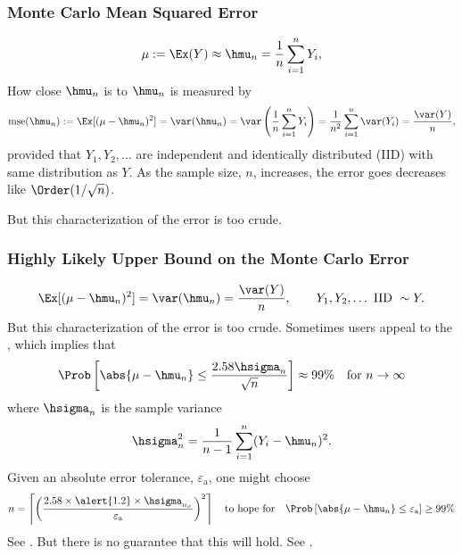 \documentclass[10pt,compress,xcolor={usenames,dvipsnames}]{beamer} %
\DeclareMathOperator{\MSE}{mse}
\newcommand{\abstol}{\varepsilon_{\text{a}}}
\begin{document}
\begin{frame}
\frametitle{Monte Carlo Mean Squared Error}
\[
\mu := \Ex(Y) \approx \hmu_n = \frac{1}{n} \sum_{i=1}^n Y_i,
\]
How close $\hmu_n$ is to $\hmu_n$ is measured by 
\[
\MSE(\hmu_n) := \Ex[(\mu-\hmu_n)^2]  = \var(\hmu_n) = \var\left(\frac{1}{n} \sum_{i=1}^n Y_i \right) =  \frac{1}{n^2} \sum_{i=1}^n \var(Y_i)= \frac{\var(Y)}{n},
\]
provided that $Y_1, Y_2, \ldots $ are independent and identically distributed (IID) with same distribution as $Y$.  As the sample size, $n$, increases, the error goes decreases like $\Order(1/\sqrt{n})$.

But this characterization of the error is too crude. 

\end{frame}

\begin{frame}
\frametitle{Highly Likely Upper Bound on the Monte Carlo Error}
\vspace{-5ex}
\[
 \Ex[(\mu-\hmu_n)^2]  = \var(\hmu_n) = \frac{\var(Y)}{n}, \qquad Y_1, Y_2, \ldots \text{ IID } \sim Y.
\]
But this characterization of the error is too crude.  Sometimes users appeal to the , which implies that
\[
\Prob\left[\abs{\mu-\hmu_n} \le \frac{2.58 \hsigma_n}{\sqrt{n}}\right] \approx 99\% \quad \text{for } n \to \infty
\]
where $\hsigma_n$ is the sample variance
\[
\hsigma_n^2 = \frac{1}{n-1} \sum_{i=1}^n (Y_i - \hmu_n)^2.
\]
Given an absolute error tolerance, $\abstol$, one might choose 
\[
n = \left \lceil \left (\frac{2.58 \times \alert{1.2} \times \hsigma_{n_\sigma}}{\abstol} \right )^2 \right \rceil \quad \text{to hope for} \quad \Prob\left[\abs{\mu-\hmu_n} \le \abstol \right] \ge 99\%
\]
See .  But there is no guarantee that this will hold.  See .

\end{frame}
\end{document}
